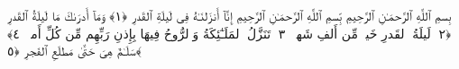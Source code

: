 
  
    
  
    
    

\nopagebreak
  بِسمِ ٱللَّهِ ٱلرَّحمَـٰنِ ٱلرَّحِيمِ
 بِّسمِ ٱللَّهِ ٱلرَّحمَـٰنِ ٱلرَّحِيمِ إِنَّآ أَنزَلنَـٰهُ فِى لَيلَةِ ٱلقَدرِ ﴿١﴾
 وَمَآ أَدرَىٰكَ مَا لَيلَةُ ٱلقَدرِ ﴿٢﴾
 لَيلَةُ ٱلقَدرِ خَيرٌۭ مِّن أَلفِ شَهرٍۢ ﴿٣﴾
 تَنَزَّلُ ٱلمَلَـٰٓئِكَةُ وَٱلرُّوحُ فِيهَا بِإِذنِ رَبِّهِم مِّن كُلِّ أَمرٍۢ ﴿٤﴾
 سَلَـٰمٌ هِىَ حَتَّىٰ مَطلَعِ ٱلفَجرِ ﴿٥﴾
 
